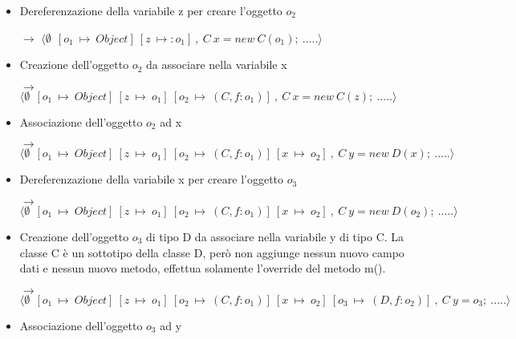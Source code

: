 \begin{itemize}
		\begin{itemize}
		\item[-] E[] $\equiv$ []
		\item[-] $t$ $\equiv$ Object z=$o_1$ 
		\item[-] $\sigma\:\equiv\:\emptyset\:\:[o_1\:\mapsto\:(Object)]$
		\end{itemize}


\vspace{0,5cm}
\item Dereferenzazione della variabile z per creare l'oggetto $o_2$

$\rightarrow$ $\langle\emptyset\:\:[o_1\:\mapsto\:Object]\:[z\:\mapsto:o_1]\:,\:C\:x=new\:C(o_1);\:.....\rangle$

\vspace{0,5cm}
\item Creazione dell'oggetto $o_2$ da associare nella variabile x

$\rightarrow$ $\langle\emptyset\:\:[o_1\:\mapsto\:Object]\:[z\:\mapsto\:o_1]\:[o_2\:\mapsto\:(C,f:o_1)]\:,\:C\:x=new\:C(z);\:.....\rangle$

\vspace{0,5cm}
\item Associazione dell'oggetto $o_2$ ad x

$\rightarrow$ $\langle\emptyset\:\:[o_1\:\mapsto\:Object]\:[z\:\mapsto\:o_1]\:[o_2\:\mapsto\:(C,f:o_1)]\:[x\:\mapsto\:o_2]\:,\:C\:y=new\:D(x);\:.....\rangle$

\vspace{0,5cm}
\item Dereferenzazione della variabile x per creare l'oggetto $o_3$

$\rightarrow$ $\langle\emptyset\:\:[o_1\:\mapsto\:Object]\:[z\:\mapsto\:o_1]\:[o_2\:\mapsto\:(C,f:o_1)]\:[x\:\mapsto\:o_2]\:,\:C\:y=new\:D(o_2);\:.....\rangle$

\vspace{0,5cm}
\item Creazione dell'oggetto $o_3$ di tipo D da associare nella variabile y di tipo C. La classe C \`e un sottotipo della classe D, per\`o non aggiunge nessun nuovo campo dati e nessun nuovo metodo, effettua solamente l'override del metodo m().

$\rightarrow$ $\langle\emptyset\:\:[o_1\:\mapsto\:Object]\:[z\:\mapsto\:o_1]\:[o_2\:\mapsto\:(C,f:o_1)]\:[x\:\mapsto\:o_2]\:[o_3\:\mapsto\:(D,f:o_2)]\:,\:C\:y=o_3;\:.....\rangle$

\vspace{0,5cm}
\item Associazione dell'oggetto $o_3$ ad y


\end{itemize}

